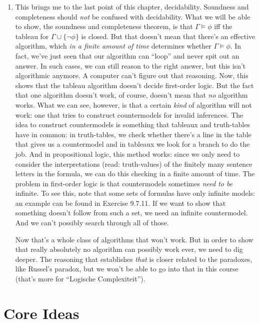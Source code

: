 \begin{enumerate}[\thesection.1]
	  \item This brings me to the last point of this chapter, decidability.
		Soundness and completeness should \emph{not} be confused with decidability.
		What we will be able to show, the soundness and completeness theorem, is that
		$\Gamma\vDash\phi$
		iff the tableau for
		$\Gamma\cup\{\neg\phi\}$
		is closed.
		But that doesn't mean that there's an effective algorithm, which \emph{in a finite amount of time} determines whether $\Gamma\vDash\phi$.
		In fact, we've just seen that our algorithm can ``loop'' and never spit out an answer.
		In such cases, we can still reason to the right answer, but this isn't algorithmic anymore.
		A computer can't figure out that reasoning.
		Now, this shows that the tableau algorithm doesn't decide first-order logic.
		But the fact that one algorithm doesn't work, of course, doesn't mean that \emph{no} algorithm works.
		What we can see, however, is that a certain \emph{kind} of algorithm will not work: one that tries to construct countermodels for invalid inferences.
		The idea to construct countermodels is something that tableaux and truth-tables have in common: in truth-tables, we check whether there's a line in the table that gives us a countermodel and in tableaux we look for a branch to do the job.
		And in propositional logic, this method works: since we only need to consider the interpretations (read: truth-values) of the finitely many  sentence letters in the formula, we can do this checking in a finite amount of time.
		The problem in first-order logic is that countermodels sometimes \emph{need to be} infinite.
		To see this, note that some sets of formulas have only infinite models: an example can be found in Exercise 9.7.11.
		If we want to show that something doesn't follow from such a set, we need an infinite countermodel.
		And we can't possibly search through all of those.
	
		Now that's a whole class of algorithms that won't work.
		But in order to show that really absolutely no algorithm can possibly work ever, we need to dig deeper.
		The reasoning that establishes \emph{that} is closer related to the paradoxes, like Russel's paradox, but we won't be able to go into that in this course (that's more for ``Logische Complexiteit'').
		
	\end{enumerate}

\section{Core Ideas}

